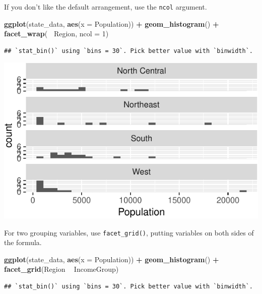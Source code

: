 \documentclass[12pt,oneside,openany]{book}
\newenvironment{Shaded}{\begin{snugshade}}{\end{snugshade}}
\newcommand{\KeywordTok}[1]{\textcolor[rgb]{0.13,0.29,0.53}{\textbf{#1}}}
\newcommand{\DataTypeTok}[1]{\textcolor[rgb]{0.13,0.29,0.53}{#1}}
\newcommand{\DecValTok}[1]{\textcolor[rgb]{0.00,0.00,0.81}{#1}}
\newcommand{\StringTok}[1]{\textcolor[rgb]{0.31,0.60,0.02}{#1}}
\newcommand{\OperatorTok}[1]{\textcolor[rgb]{0.81,0.36,0.00}{\textbf{#1}}}
\newcommand{\NormalTok}[1]{#1}
\begin{document}
If you don't like the default arrangement, use the \texttt{ncol}
argument.

\begin{Shaded}
\begin{Highlighting}[]
\KeywordTok{ggplot}\NormalTok{(state_data, }\KeywordTok{aes}\NormalTok{(}\DataTypeTok{x =}\NormalTok{ Population)) }\OperatorTok{+}
\StringTok{  }\KeywordTok{geom_histogram}\NormalTok{() }\OperatorTok{+}
\StringTok{  }\KeywordTok{facet_wrap}\NormalTok{(}\OperatorTok{~}\StringTok{ }\NormalTok{Region, }\DataTypeTok{ncol =} \DecValTok{1}\NormalTok{)}
\end{Highlighting}
\end{Shaded}

\begin{verbatim}
## `stat_bin()` using `bins = 30`. Pick better value with `binwidth`.
\end{verbatim}

\includegraphics{pdaps_files/figure-latex/facet-wrap-ncol-1.pdf}

For two grouping variables, use \texttt{facet\_grid()}, putting
variables on both sides of the formula.

\begin{Shaded}
\begin{Highlighting}[]
\KeywordTok{ggplot}\NormalTok{(state_data, }\KeywordTok{aes}\NormalTok{(}\DataTypeTok{x =}\NormalTok{ Population)) }\OperatorTok{+}
\StringTok{  }\KeywordTok{geom_histogram}\NormalTok{() }\OperatorTok{+}
\StringTok{  }\KeywordTok{facet_grid}\NormalTok{(Region }\OperatorTok{~}\StringTok{ }\NormalTok{IncomeGroup)}
\end{Highlighting}
\end{Shaded}

\begin{verbatim}
## `stat_bin()` using `bins = 30`. Pick better value with `binwidth`.
\end{verbatim}
\end{document}
